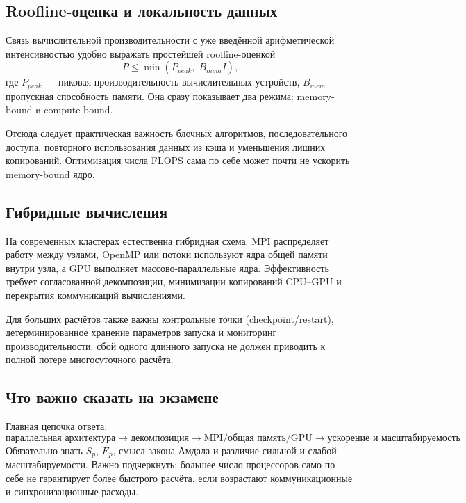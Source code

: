 \subsection{Roofline-оценка и локальность данных}

Связь вычислительной производительности с уже введённой арифметической
интенсивностью удобно выражать простейшей roofline-оценкой
\[
\boxed{P\le \min(P_{peak},\;B_{mem}I)},
\]
где $P_{peak}$ --- пиковая производительность вычислительных устройств,
$B_{mem}$ --- пропускная способность памяти. Она сразу показывает два режима:
memory-bound и compute-bound.

Отсюда следует практическая важность блочных алгоритмов, последовательного
доступа, повторного использования данных из кэша и уменьшения лишних копирований.
Оптимизация числа FLOPS сама по себе может почти не ускорить memory-bound ядро.

\subsection{Гибридные вычисления}

На современных кластерах естественна гибридная схема: MPI распределяет работу
между узлами, OpenMP или потоки используют ядра общей памяти внутри узла, а GPU
выполняет массово-параллельные ядра. Эффективность требует согласованной
декомпозиции, минимизации копирований CPU--GPU и перекрытия коммуникаций
вычислениями.

Для больших расчётов также важны контрольные точки (checkpoint/restart),
детерминированное хранение параметров запуска и мониторинг производительности:
сбой одного длинного запуска не должен приводить к полной потере многосуточного
расчёта.


\subsection{Что важно сказать на экзамене}

Главная цепочка ответа:
\[
\boxed{\text{параллельная архитектура}
\rightarrow
\text{декомпозиция}
\rightarrow
\text{MPI/общая память/GPU}
\rightarrow
\text{ускорение и масштабируемость}}.
\]
Обязательно знать $S_p$, $E_p$, смысл закона Амдала и различие сильной и слабой масштабируемости. Важно подчеркнуть: большее число процессоров само по себе не гарантирует более быстрого расчёта, если возрастают коммуникационные и синхронизационные расходы.

\newpage
